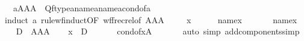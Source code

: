 \begin{isabellebody}
\ \ \ {\isachardoublequoteopen}a{\isasymin}{}{\isasymtimes}A{}{\isasymtimes}A{}{\isasymtimes}A{}\ {\isasymLongrightarrow}\ Q{\isacharparenleft}{\kern0pt}ftype{\isacharparenleft}{\kern0pt}a{\isacharparenright}{\kern0pt}{\isacharcomma}{\kern0pt}name{}{\isacharparenleft}{\kern0pt}a{\isacharparenright}{\kern0pt}{\isacharcomma}{\kern0pt}name{}{\isacharparenleft}{\kern0pt}a{\isacharparenright}{\kern0pt}{\isacharcomma}{\kern0pt}cond{\isacharunderscore}{\kern0pt}of{\isacharparenleft}{\kern0pt}a{\isacharparenright}{\kern0pt}{\isacharparenright}{\kern0pt}{\isachardoublequoteclose}\isanewline
%
\isadelimproof
%
\endisadelimproof
%
\isatagproof
{}\isamarkupfalse%
\ {\isacharparenleft}{\kern0pt}induct\ a\ rule{\isacharcolon}{\kern0pt}wf{\isacharunderscore}{\kern0pt}induct{\isacharbrackleft}{\kern0pt}OF\ wf{\isacharunderscore}{\kern0pt}frecrel{\isacharbrackleft}{\kern0pt}of\ {\isachardoublequoteopen}{}{\isasymtimes}A{}{\isasymtimes}A{}{\isasymtimes}A{}{\isachardoublequoteclose}{\isacharbrackright}{\kern0pt}{\isacharbrackright}{\kern0pt}{\isacharparenright}{\kern0pt}\isanewline
\ \ \isamarkupfalse%
\ {\isacharparenleft}{\kern0pt}{}\ x{\isacharparenright}{\kern0pt}\isanewline
\ \ \isamarkupfalse%
\ {\isacharquery}{\kern0pt}{\isasymtau}\ {\isacharequal}{\kern0pt}\ {\isachardoublequoteopen}name{}{\isacharparenleft}{\kern0pt}x{\isacharparenright}{\kern0pt}{\isachardoublequoteclose}\ \isanewline
\ \ \isamarkupfalse%
\ {\isacharquery}{\kern0pt}{\isasymtheta}\ {\isacharequal}{\kern0pt}\ {\isachardoublequoteopen}name{}{\isacharparenleft}{\kern0pt}x{\isacharparenright}{\kern0pt}{\isachardoublequoteclose}\isanewline
\ \ \isamarkupfalse%
\ {\isacharquery}{\kern0pt}D\ {\isacharequal}{\kern0pt}\ {\isachardoublequoteopen}{}{\isasymtimes}A{}{\isasymtimes}A{}{\isasymtimes}A{}{\isachardoublequoteclose}\isanewline
\ \ \isamarkupfalse%
\ {\isachardoublequoteopen}x\ {\isasymin}\ {\isacharquery}{\kern0pt}D{\isachardoublequoteclose}\isanewline
\ \ \isamarkupfalse%
\isanewline
\ \ \isamarkupfalse%
\ {\isachardoublequoteopen}cond{\isacharunderscore}{\kern0pt}of{\isacharparenleft}{\kern0pt}x{\isacharparenright}{\kern0pt}{\isasymin}A{}{\isachardoublequoteclose}\ \isanewline
\ \ \ \ \isamarkupfalse%
\ {\isacharparenleft}{\kern0pt}auto\ simp\ add{\isacharcolon}{\kern0pt}components{\isacharunderscore}{\kern0pt}simp{\isacharparenright}{\kern0pt}\isanewline

\end{isabellebody}
